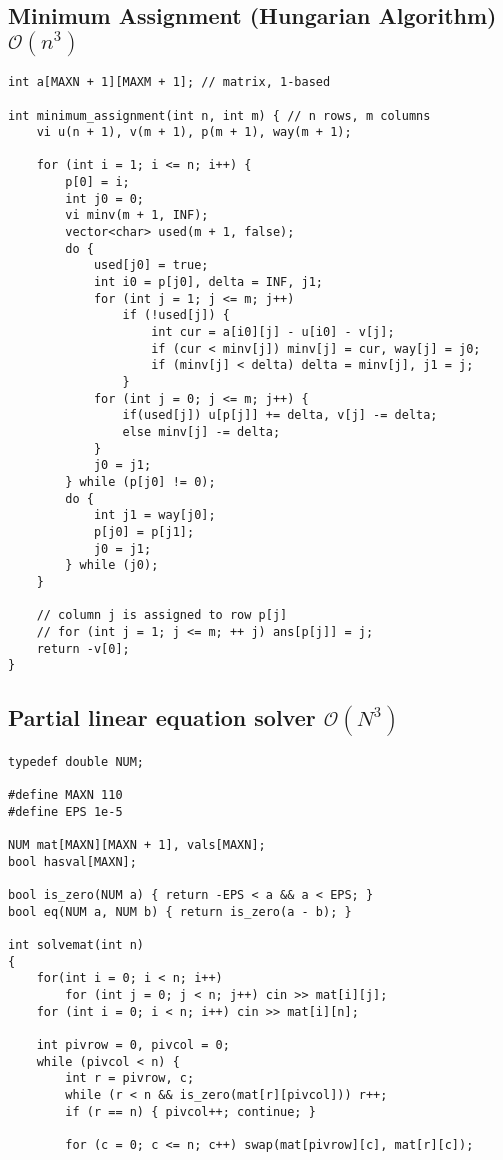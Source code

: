 \documentclass[8pt,a4paper,landscape,oneside]{amsart}
\begin{document}
\begin{multicols*}{3}
\subsection{Minimum Assignment (Hungarian Algorithm) $\mathcal{O}(n^{3})$}

\begin{lstlisting}
int a[MAXN + 1][MAXM + 1]; // matrix, 1-based

int minimum_assignment(int n, int m) { // n rows, m columns
	vi u(n + 1), v(m + 1), p(m + 1), way(m + 1);

	for (int i = 1; i <= n; i++) {
		p[0] = i;
		int j0 = 0;
		vi minv(m + 1, INF);
		vector<char> used(m + 1, false);
		do {
			used[j0] = true;
			int i0 = p[j0], delta = INF, j1;
			for (int j = 1; j <= m; j++)
				if (!used[j]) {
					int cur = a[i0][j] - u[i0] - v[j];
					if (cur < minv[j]) minv[j] = cur, way[j] = j0;
					if (minv[j] < delta) delta = minv[j], j1 = j;
				}
			for (int j = 0; j <= m; j++) {
				if(used[j]) u[p[j]] += delta, v[j] -= delta;
				else minv[j] -= delta;
			}
			j0 = j1;
		} while (p[j0] != 0);
		do {
			int j1 = way[j0];
			p[j0] = p[j1];
			j0 = j1;
		} while (j0);
	}

	// column j is assigned to row p[j]
	// for (int j = 1; j <= m; ++ j) ans[p[j]] = j;
	return -v[0];
}
\end{lstlisting}

\subsection{Partial linear equation solver $\mathcal{O}(N^3)$}

\begin{lstlisting}
typedef double NUM;

#define MAXN 110
#define EPS 1e-5

NUM mat[MAXN][MAXN + 1], vals[MAXN];
bool hasval[MAXN];

bool is_zero(NUM a) { return -EPS < a && a < EPS; }
bool eq(NUM a, NUM b) { return is_zero(a - b); }

int solvemat(int n)
{
	for(int i = 0; i < n; i++)
		for (int j = 0; j < n; j++) cin >> mat[i][j];
	for (int i = 0; i < n; i++) cin >> mat[i][n];

	int pivrow = 0, pivcol = 0;
	while (pivcol < n) {
		int r = pivrow, c;
		while (r < n && is_zero(mat[r][pivcol])) r++;
		if (r == n) { pivcol++; continue; }

		for (c = 0; c <= n; c++) swap(mat[pivrow][c], mat[r][c]);


\end{lstlisting}
\end{multicols*}
\end{document}
